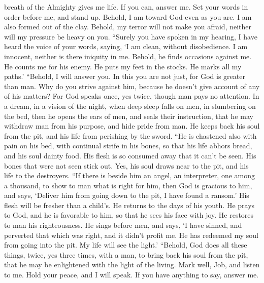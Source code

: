 breath of the Almighty gives me life.  If you can, answer
me. Set your words in order before me, and stand up. 
Behold, I am toward God even as you are. I am also formed out of the
clay.  Behold, my terror will not make you afraid, neither
will my pressure be heavy on you.  ``Surely you have spoken
in my hearing, I have heard the voice of your words, saying,
 `I am clean, without disobedience. I am innocent, neither
is there iniquity in me.  Behold, he finds occasions
against me. He counts me for his enemy.  He puts my feet in
the stocks. He marks all my paths.'  ``Behold, I will
answer you. In this you are not just, for God is greater than man.
 Why do you strive against him, because he doesn't give
account of any of his matters?  For God speaks once, yes
twice, though man pays no attention.  In a dream, in a
vision of the night, when deep sleep falls on men, in slumbering on the
bed,  then he opens the ears of men, and seals their
instruction,  that he may withdraw man from his purpose,
and hide pride from man.  He keeps back his soul from the
pit, and his life from perishing by the sword.  ``He is
chastened also with pain on his bed, with continual strife in his bones,
 so that his life abhors bread, and his soul dainty food.
 His flesh is so consumed away that it can't be seen. His
bones that were not seen stick out.  Yes, his soul draws
near to the pit, and his life to the destroyers.  ``If
there is beside him an angel, an interpreter, one among a thousand, to
show to man what is right for him,  then God is gracious to
him, and says, `Deliver him from going down to the pit, I have found a
ransom.'  His flesh will be fresher than a child's. He
returns to the days of his youth.  He prays to God, and he
is favorable to him, so that he sees his face with joy. He restores to
man his righteousness.  He sings before men, and says, `I
have sinned, and perverted that which was right, and it didn't profit
me.  He has redeemed my soul from going into the pit. My
life will see the light.'  ``Behold, God does all these
things, twice, yes three times, with a man,  to bring back
his soul from the pit, that he may be enlightened with the light of the
living.  Mark well, Job, and listen to me. Hold your peace,
and I will speak.  If you have anything to say, answer me.
